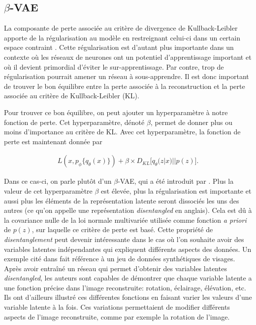 \subsection{$\beta$-VAE} \label{beta-vae}

La composante de perte associée au critère de divergence de Kullback-Leibler apporte de la régularisation au modèle en restreignant celui-ci dans un certain espace contraint \citep{kingma2013autoencoding}. Cette régularisation est d'autant plus importante dans un contexte où les réseaux de neurones ont un potentiel d'apprentissage important et où il devient primordial d'éviter le sur-apprentissage. Par contre, trop de régularisation pourrait amener un réseau à sous-apprendre. Il est donc important de trouver le bon équilibre entre la perte associée à la reconstruction et la perte associée au critère de Kullback-Leibler (KL).

Pour trouver ce bon équilibre, on peut ajouter un hyperparamètre à notre fonction de perte. Cet hyperparamètre, dénoté $\beta$, permet de donner plus ou moins d'importance au critère de KL. Avec cet hyperparamètre, la fonction de perte est maintenant donnée par

\begin{gather}  \label{eq:loss_betavae}
L(x, p_\phi\{q_\theta(x)\}) +  \beta \times D_{KL}\big[q_\theta(z|x) || p(z)\big].
\end{gather}

Dans ce cas-ci, on parle plutôt d'un $\beta$-VAE, qui a été introduit par \cite{Higgins2017betaVAELB}. Plus la valeur de cet hyperparamètre $\beta$ est élevée, plus la régularisation est importante et aussi plus les éléments de la représentation latente seront dissociés les uns des autres (ce qu'on appelle une représentation \textit{disentangled} en anglais). Cela est dû à la covariance nulle de la loi normale multivariée utilisée comme fonction \textit{a priori} de $p(z)$, sur laquelle ce critère de perte est basé. Cette propriété de \textit{disentanglement} peut devenir intéressante dans le cas où l'on souhaite avoir des variables latentes indépendantes qui expliquent différents aspects des données. Un exemple cité dans \cite{Higgins2017betaVAELB} fait référence à un jeu de données synthétiques de visages. Après avoir entraîné un réseau qui permet d'obtenir des variables latentes \textit{disentangled}, les auteurs sont capables de démontrer que chaque variable latente a une fonction précise dans l'image reconstruite: rotation, éclairage, élévation, etc. Ils ont d'ailleurs illustré ces différentes fonctions en faisant varier les valeurs d'une variable latente à la fois. Ces variations permettaient de modifier différents aspects de l'image reconstruite, comme par exemple la rotation de l'image.

